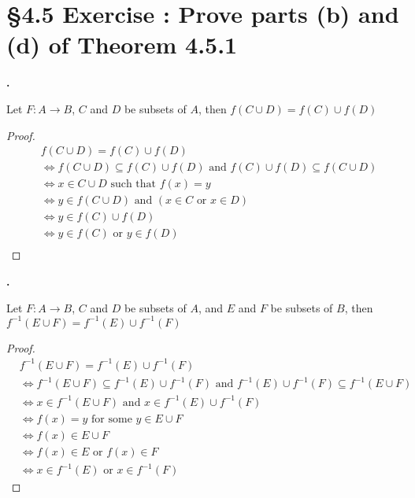 \documentclass[a4paper,11pt]{article}
\begin{document}
\section*{\S 4.5 Exercise : Prove parts {(b)} and {(d)} of Theorem 4.5.1}
\setcounter{SubsectionCounter}{2}
\textbf{.}
\begin{theorem1}
  Let \(F:A \rightarrow B\), \(C\) and \(D\) be subsets of \(A\), then \(f{(C \cup D)}=f{(C)} \cup f{(D)}\)
  \begin{proof}
    \begin{align*}
      &f{(C \cup D)}=f{(C)} \cup f{(D)}\\
      &\Leftrightarrow f{(C \cup D)} \subseteq f{(C)} \cup f{(D)} \text{ and } f{(C)} \cup f{(D)} \subseteq f{(C \cup 
      D)}\\
      &\Leftrightarrow x \in C \cup D \text{ such that } f{(x)} = y\\
      &\Leftrightarrow y \in f{(C \cup D)} \text{ and } {(x \in C \text{ or } x \in D)}\\
      &\Leftrightarrow y \in f{(C)} \cup f{(D)}\\
      &\Leftrightarrow y \in f{(C)} \text{ or } y \in f{(D)}\\
    \end{align*}
\end{proof}
\end{theorem1}
\newpage
\setcounter{SubsectionCounter}{4}
\noindent\textbf{.}
\begin{theorem1}
  Let \(F:A \rightarrow B\), \(C\) and \(D\) be subsets of \(A\), and \(E\) and \(F\) be subsets of \(B\), then \(f^{-1}{(E \cup F)} = f^{-1}{(E)} \cup f^{-1}{(F)}\)
  \begin{proof}
    \begin{align*}
      &f^{-1}{(E \cup F)} = f^{-1}{(E)} \cup f^{-1}{(F)}\\
      &\Leftrightarrow f^{-1}{(E \cup F)} \subseteq f^{-1}{(E)} \cup f^{-1}{(F)} \text{ and } f^{-1}{(E)} \cup f^{-1}{(F)} \subseteq f^{-1}{(E \cup 
    F)}\\
      &\Leftrightarrow x \in f^{-1}{(E \cup F)} \text{ and } x \in f^{-1}{(E)} \cup f^{-1}{(F)}\\
      &\Leftrightarrow f{(x)} = y \text{ for some } y \in E \cup F\\
      &\Leftrightarrow f{(x)} \in E \cup F\\
      &\Leftrightarrow f{(x)} \in E \text{ or } f{(x)} \in F\\
      &\Leftrightarrow x \in f^{-1}{(E)} \text{ or } x \in f^{-1}{(F)}
    \end{align*}
  \end{proof}
\end{theorem1}
\newpage
\setcounter{ProblemCounter}{1}
\end{document}
